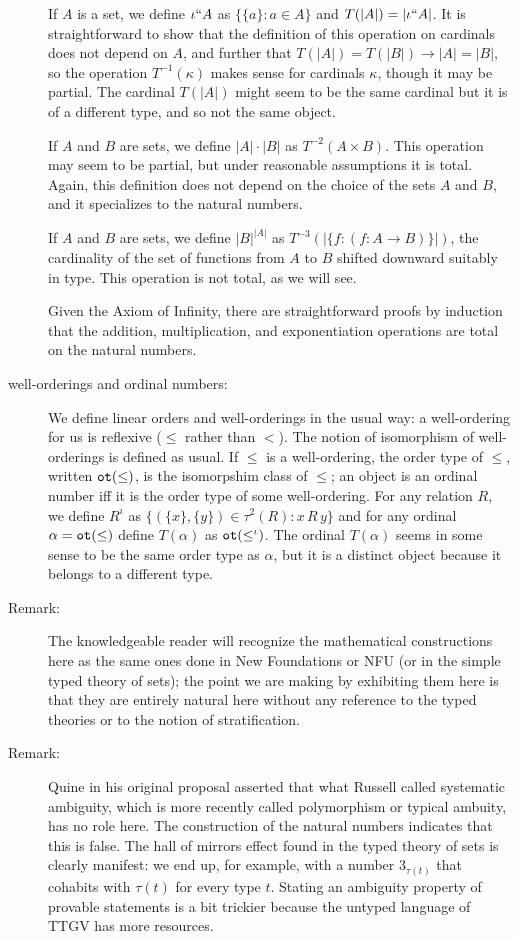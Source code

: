 \documentclass[12pt]{article}
\begin{document}
\begin{description}
If $A$ is a set, we define $\iota``A$ as $\{\{a\}:a \in A\}$ and $T(|A|) = |\iota``A|$.  It is straightforward to show that the definition of this operation on cardinals does not depend on $A$, and further that $T(|A|) = T(|B|) \rightarrow |A|=|B|$, so the operation $T^{-1}(\kappa)$ makes sense for cardinals $\kappa$, though it may be partial.  The cardinal
$T(|A|)$ might seem to be the same cardinal but it is of a different type, and so not the same object.

If $A$ and $B$ are sets, we define $|A| \cdot |B|$ as $T^{-2}(A \times B)$.  This operation may seem to be partial, but under reasonable assumptions it is total.  Again, this definition does not depend on the choice of the sets $A$ and $B$, and it specializes to the natural numbers.

If $A$ and $B$ are sets, we define $|B|^{|A|}$ as $T^{-3}(|\{f:(f:A \rightarrow B)\}|)$, the cardinality of the set of functions from $A$ to $B$ shifted downward suitably in type.  This operation is not total, as we will see.

Given the Axiom of Infinity, there are straightforward proofs by induction that the addition, multiplication, and exponentiation operations are total on the natural numbers.

\item[well-orderings and ordinal numbers:]  We define linear orders and well-orderings in the usual way:  a well-ordering for us is reflexive ($\leq$ rather than $<$).  The notion of isomorphism of well-orderings is defined as usual.  If $\leq$ is a well-ordering, the order type of $\leq$, written ${\tt ot}(\leq)$, is the isomorpshim class of $\leq$;  an object is an ordinal number iff it is the order type of some well-ordering.  For any relation $R$, we define $R^{\iota}$ as $\{(\{x\},\{y\}) \in \tau^2(R):x \, R \, y\}$ and for any ordinal $\alpha ={\tt ot}(\leq)$ define $T(\alpha)$ as ${\tt ot}(\leq^\iota)$.  The ordinal $T(\alpha)$ seems in some sense to be the same order type as $\alpha$, but it is a distinct object because it belongs to a different type.

\item[Remark:]  The knowledgeable reader will recognize the mathematical constructions here as the same ones done in New Foundations or NFU (or in the simple typed theory of sets);  the point we are making by exhibiting them here is that they are entirely natural here without any reference to the typed theories or to the notion of stratification.

\item[Remark:]  Quine in his original proposal asserted that what Russell called systematic ambiguity, which is more recently called polymorphism or typical ambuity, has no role here.  The construction of the natural numbers indicates that this is false.  The hall of mirrors effect found in the typed theory of sets
is clearly manifest:  we end up, for example, with a number $3_{\tau(t)}$ that cohabits with $\tau(t)$ for every type $t$.  Stating an ambiguity property of provable statements is a bit trickier because the untyped language of TTGV has more resources.

\end{description}
\end{document}
